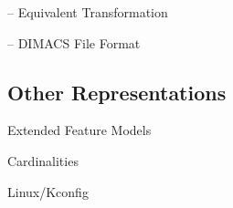 \begin{frame}{-- Equivalent Transformation}
	
\end{frame}

\begin{frame}{-- DIMACS File Format}
	
\end{frame}


\subsection{Other Representations} %

\begin{frame}{\insertsubsection}
	Extended Feature Models
	

	Cardinalities

	Linux/Kconfig %
\end{frame}







